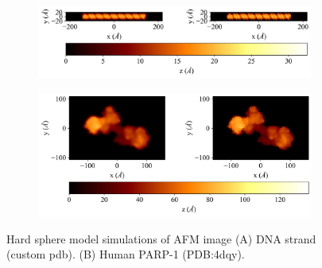 \begin{figure}[H]

    \begin{subfigure}[t]{1\textwidth}
        \centering
        \caption{\label{fig: 8BNA AFM Image HS} }
        \includegraphics[width=1\linewidth]{Figures/AFMSimulationMolecule-bdna8_HS.png} 
    \end{subfigure}
    \hfill
    \begin{subfigure}[t]{1\textwidth}
        \centering
        \caption{\label{fig: PARP AFM Sim} }
        \includegraphics[width=1\linewidth]{Figures/AFMSimulationMolecule-4dqy_HS.png}
    \end{subfigure}
    \caption{\label{fig: AFM Simulation}Hard sphere model simulations of AFM image (A) DNA strand (custom pdb). (B) Human PARP-1 (PDB:4dqy).}
\end{figure}
